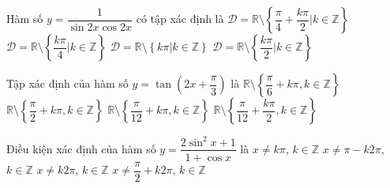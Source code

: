 \begin{ex}%
	 Hàm số $ y=\dfrac{1}{\sin 2x\cos 2x}$ có tập xác định là
	\choice 
		 {$\mathscr{D}=\mathbb{R}\setminus\left\{\dfrac{\pi}{4}+\dfrac{k\pi}{2}\big|k\in\mathbb{Z}\right\}$}
		{\True  $\mathscr{D}=\mathbb{R}\setminus\left\{\dfrac{k\pi}{4}\big|k\in\mathbb{Z}\right\}$}
		{$\mathscr{D}=\mathbb{R}\setminus\left\{  k\pi \big|k\in\mathbb{Z}\right\}$}
		 {$\mathscr{D}=\mathbb{R}\setminus\left\{\dfrac{k\pi}{2}\big|k\in\mathbb{Z}\right\}$}
\end{ex}

\begin{ex}%
	Tập xác định của  hàm số $y=\tan \left(2x+\dfrac{\pi}{3} \right)$ là
	 \choice
		{$\mathbb{R}\setminus  \left\{\dfrac{\pi}{6}+k\pi,k\in \mathbb{Z}\right\}$}
		{$\mathbb{R}\setminus  \left\{\dfrac{\pi}{2}+k\pi,k\in \mathbb{Z}\right\}$}
		{$\mathbb{R}\setminus \left\{\dfrac{\pi}{12}+k\pi,k\in \mathbb{Z}\right\}$} 
		 {\True $\mathbb{R}\setminus \left\{\dfrac{\pi}{12}+\dfrac{k\pi}{2},k\in \mathbb{Z}\right\}$}
\end{ex}

\begin{ex}%
	Điều kiện xác định của hàm số $y=\dfrac{2\sin  ^2x+1}{1+\cos x}$ là
	 \choice
		{$x\ne k\pi$, $ k\in  \mathbb{Z}$}
		 {\True $x\ne \pi-k2\pi$, $ k\in \mathbb{Z}$}
		{$x\ne k2\pi$, $ k\in  \mathbb{Z}$}
		{$x\ne \dfrac{\pi}{2}+k2\pi$, $  k\in \mathbb{Z}$}
\end{ex}

